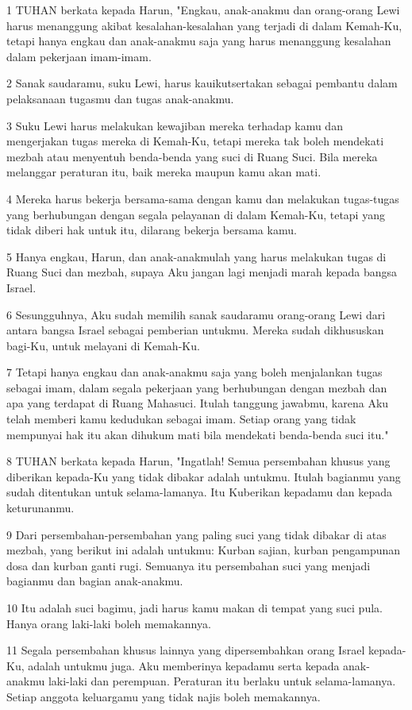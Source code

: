 \par 1 TUHAN berkata kepada Harun, "Engkau, anak-anakmu dan orang-orang Lewi harus menanggung akibat kesalahan-kesalahan yang terjadi di dalam Kemah-Ku, tetapi hanya engkau dan anak-anakmu saja yang harus menanggung kesalahan dalam pekerjaan imam-imam.
\par 2 Sanak saudaramu, suku Lewi, harus kauikutsertakan sebagai pembantu dalam pelaksanaan tugasmu dan tugas anak-anakmu.
\par 3 Suku Lewi harus melakukan kewajiban mereka terhadap kamu dan mengerjakan tugas mereka di Kemah-Ku, tetapi mereka tak boleh mendekati mezbah atau menyentuh benda-benda yang suci di Ruang Suci. Bila mereka melanggar peraturan itu, baik mereka maupun kamu akan mati.
\par 4 Mereka harus bekerja bersama-sama dengan kamu dan melakukan tugas-tugas yang berhubungan dengan segala pelayanan di dalam Kemah-Ku, tetapi yang tidak diberi hak untuk itu, dilarang bekerja bersama kamu.
\par 5 Hanya engkau, Harun, dan anak-anakmulah yang harus melakukan tugas di Ruang Suci dan mezbah, supaya Aku jangan lagi menjadi marah kepada bangsa Israel.
\par 6 Sesungguhnya, Aku sudah memilih sanak saudaramu orang-orang Lewi dari antara bangsa Israel sebagai pemberian untukmu. Mereka sudah dikhususkan bagi-Ku, untuk melayani di Kemah-Ku.
\par 7 Tetapi hanya engkau dan anak-anakmu saja yang boleh menjalankan tugas sebagai imam, dalam segala pekerjaan yang berhubungan dengan mezbah dan apa yang terdapat di Ruang Mahasuci. Itulah tanggung jawabmu, karena Aku telah memberi kamu kedudukan sebagai imam. Setiap orang yang tidak mempunyai hak itu akan dihukum mati bila mendekati benda-benda suci itu."
\par 8 TUHAN berkata kepada Harun, "Ingatlah! Semua persembahan khusus yang diberikan kepada-Ku yang tidak dibakar adalah untukmu. Itulah bagianmu yang sudah ditentukan untuk selama-lamanya. Itu Kuberikan kepadamu dan kepada keturunanmu.
\par 9 Dari persembahan-persembahan yang paling suci yang tidak dibakar di atas mezbah, yang berikut ini adalah untukmu: Kurban sajian, kurban pengampunan dosa dan kurban ganti rugi. Semuanya itu persembahan suci yang menjadi bagianmu dan bagian anak-anakmu.
\par 10 Itu adalah suci bagimu, jadi harus kamu makan di tempat yang suci pula. Hanya orang laki-laki boleh memakannya.
\par 11 Segala persembahan khusus lainnya yang dipersembahkan orang Israel kepada-Ku, adalah untukmu juga. Aku memberinya kepadamu serta kepada anak-anakmu laki-laki dan perempuan. Peraturan itu berlaku untuk selama-lamanya. Setiap anggota keluargamu yang tidak najis boleh memakannya.
